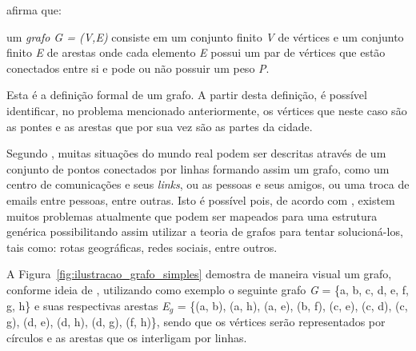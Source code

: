 \par {} afirma que: 

\begin{citacao}
	um \textit{grafo G = (V,E)} consiste em um conjunto finito \textit{V} de vértices e um conjunto finito \textit{E} de arestas onde cada elemento \textit{E} possui um par de vértices que estão conectados entre si e pode ou não possuir um peso \textit{P}.
\end{citacao}

\par Esta é a definição formal de um grafo. A partir desta definição, é possível identificar, no problema mencionado anteriormente, os vértices que neste caso são as pontes e as arestas que por sua vez são as partes da cidade.

\par Segundo , muitas situações do mundo real podem ser descritas através de um conjunto de pontos conectados por linhas formando assim um grafo, como um centro de comunicações e seus \textit{links}, ou as pessoas e seus amigos, ou uma troca de emails entre pessoas, entre outras. Isto é possível pois, de acordo com , existem muitos problemas atualmente que podem ser mapeados para uma estrutura genérica possibilitando assim utilizar a teoria de grafos para tentar solucioná-los, tais como: rotas geográficas, redes sociais, entre outros.

\par A Figura~\ref{fig:ilustracao_grafo_simples} demostra de maneira visual um grafo, conforme ideia de , utilizando como exemplo o seguinte grafo \textit{G} = \{a, b, c, d, e, f, g, h\} e suas respectivas arestas \textit{E}$_g$ = \{(a, b), (a, h), (a, e), (b, f), (c, e), (c, d), (c, g), (d, e), (d, h), (d, g), (f, h)\}, sendo que os vértices serão representados por círculos e as arestas que os interligam por linhas.


